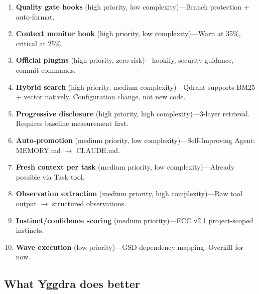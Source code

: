 \documentclass[11pt,a4paper]{article}
\begin{document}
\begin{enumerate}
  \item \textbf{Quality gate hooks} (high priority, low complexity)---Branch protection + auto-format.
  \item \textbf{Context monitor hook} (high priority, low complexity)---Warn at 35\%, critical at 25\%.
  \item \textbf{Official plugins} (high priority, zero risk)---hookify, security-guidance, commit-commands.
  \item \textbf{Hybrid search} (high priority, medium complexity)---Qdrant supports BM25 + vector natively. Configuration change, not new code.
  \item \textbf{Progressive disclosure} (high priority, high complexity)---3-layer retrieval. Requires baseline measurement first.
  \item \textbf{Auto-promotion} (medium priority, low complexity)---Self-Improving Agent: MEMORY.md $\rightarrow$ CLAUDE.md.
  \item \textbf{Fresh context per task} (medium priority, low complexity)---Already possible via Task tool.
  \item \textbf{Observation extraction} (medium priority, high complexity)---Raw tool output $\rightarrow$ structured observations.
  \item \textbf{Instinct/confidence scoring} (medium priority)---ECC v2.1 project-scoped instincts.
  \item \textbf{Wave execution} (low priority)---GSD dependency mapping. Overkill for now.
\end{enumerate}

\subsection{What Yggdra does better}
\end{document}
